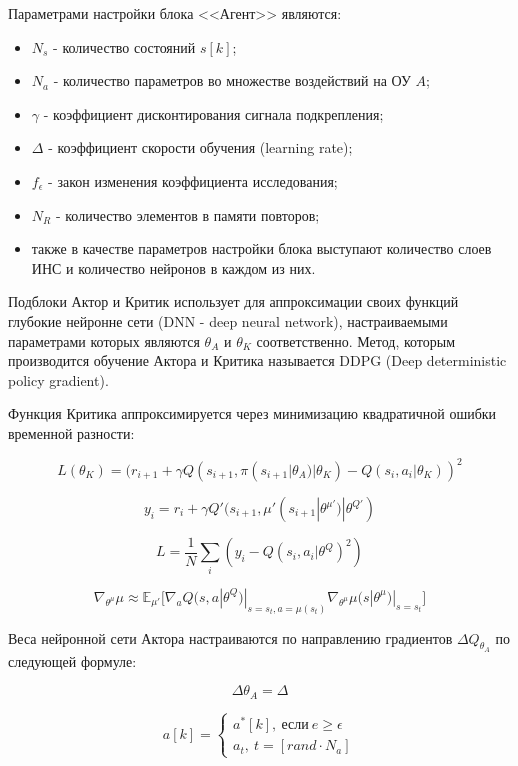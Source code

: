 Параметрами настройки блока <<Агент>> являются:
\begin{itemize}
	\item $ N_s $ - количество состояний $s[k]$;
	\item $ N_a $ - количество параметров во множестве воздействий на ОУ $ A $;
	\item $ \gamma $ - коэффициент дисконтирования сигнала подкрепления;
	\item $ \Delta $ - коэффициент скорости обучения (learning rate);
	\item $ f_{\epsilon} $ - закон изменения коэффициента исследования;
	\item $ N_R $ - количество элементов в памяти повторов;
	\item также в качестве параметров настройки блока выступают количество слоев ИНС и количество нейронов в каждом из них.
\end{itemize}
 
Подблоки Актор и Критик использует для аппроксимации своих функций глубокие нейронне сети (DNN - deep neural network), настраиваемыми параметрами которых являются $ \theta_A $ и $ \theta_K $ соответственно. Метод, которым производится обучение Актора и Критика называется DDPG (Deep deterministic policy gradient). 

Функция Критика аппроксимируется через минимизацию квадратичной ошибки временной разности:

$$
L(\theta_K) = (r_{i+1} + \gamma Q(s_{i+1}, \pi(s_{i+1}|\theta_A)|\theta_K) - Q(s_i, a_i|\theta_K))^2
$$

$$
y_i = r_i + \gamma Q'(s_{i + 1}, \mu'(s_{i+1}|\theta^{\mu'})|\theta^{Q'})
$$

$$
L = \frac{1}{N} \sum_{i} (y_i - Q(s_i, a_i | \theta^{Q})^2) 
$$

$$
\nabla_{\theta^{\mu}} \mu \approx \mathbb{E}_{\mu'} \big [ \nabla_{a} Q(s, a|\theta^{Q})|_{s=s_t,a=\mu(s_t)} \nabla_{\theta^{\mu}} \mu(s|\theta^{\mu})|_{s=s_t} \big ]
$$

Веса нейронной сети Актора настраиваются по направлению градиентов $ \Delta Q_{\theta_A} $ по следующей формуле:

$$ 
\Delta \theta_A = \Delta
$$

$$
a[k] = 
\begin{cases}
a^*[k], \: \text{если} \: e \geq \epsilon  \\
a_t, \: t=[rand \cdot N_a]
\end{cases}
$$

